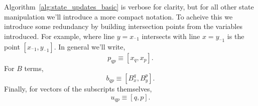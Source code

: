 Algorithm~\ref{alg:state_updates_basic} is verbose for clarity,
but for all other state manipulation we'll introduce a more compact
notation.  To acheive this we introduce some redundancy by
building intersection points from the variables introduced.
For example,
where line $y = x_{^-1}$ intersects with line $x = y_{^-1}$ is
the point $[x_{^-1}, y_{^-1}]$.  In general we'll write,
\begin{equation} \label{eq:p_sm}
  p_{qp} \equiv [x_q, x_p].
\end{equation}
For $B$ terms,
\begin{equation}
  b_{qp} \equiv [B_x^q, B_y^p].
  \label{eq:b_sm}
\end{equation}
Finally, for vectors of the subscripts themselves,
\begin{equation}
  u_{qp} \equiv [q, p].
  \label{eq:u_sm}
\end{equation}

